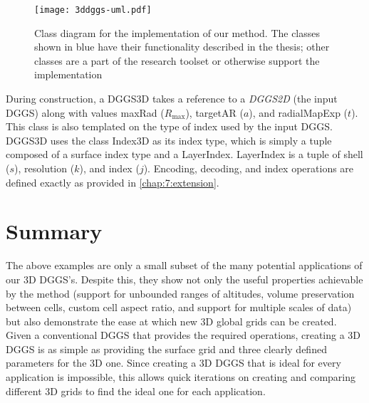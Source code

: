 \begin{figure}[ht!]
	\centering
	\texttt{[image: 3ddggs-uml.pdf]}
	\caption[Class diagram of the grid extension implementation]{
		Class diagram for the implementation of our method. The classes shown in blue have their functionality described in the thesis; other classes are a part of the research toolset or otherwise support the implementation
	}
	\label{fig:uml}
\end{figure}


During construction, a DGGS3D takes a reference to a \textit{DGGS2D} (the input DGGS) along with values maxRad ($R_\mathrm{max}$), targetAR ($a$), and radialMapExp ($t$).
This class is also templated on the type of index used by the input DGGS. DGGS3D uses the class Index3D as its index type, which is simply a tuple composed of a surface index type and a LayerIndex.
LayerIndex is a tuple of shell ($s$), resolution ($k$), and index ($j$).
Encoding, decoding, and index operations are defined exactly as provided in \cref{chap:7:extension}.



\section{Summary}
The above examples are only a small subset of the many potential applications of our 3D DGGS's.
Despite this, they show not only the useful properties achievable by the method (support for unbounded ranges of altitudes, volume preservation between cells, custom cell aspect ratio, and support for multiple scales of data) but also demonstrate the ease at which new 3D global grids can be created.
Given a conventional DGGS that provides the required operations, creating a 3D DGGS is as simple as providing the surface grid and three clearly defined parameters for the 3D one.
Since creating a 3D DGGS that is ideal for every application is impossible, this allows quick iterations on creating and comparing different 3D grids to find the ideal one for each application.
